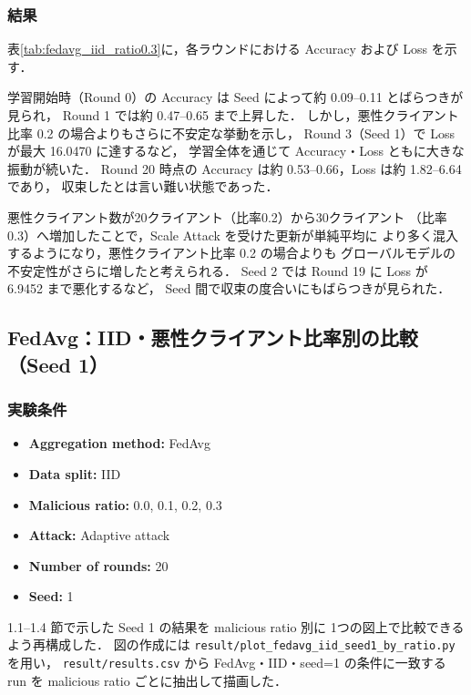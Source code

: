 \documentclass[a4j,twocolumn,dvipdfmx]{jsarticle}
\begin{document}
\subsubsection{結果}

表\ref{tab:fedavg_iid_ratio0.3}に，各ラウンドにおける
Accuracy および Loss を示す．

学習開始時（Round 0）の Accuracy は Seed によって約 0.09--0.11 とばらつきが見られ，
Round 1 では約 0.47--0.65 まで上昇した．
しかし，悪性クライアント比率 0.2 の場合よりもさらに不安定な挙動を示し，
Round 3（Seed 1）で Loss が最大 16.0470 に達するなど，
学習全体を通じて Accuracy・Loss ともに大きな振動が続いた．
Round 20 時点の Accuracy は約 0.53--0.66，Loss は約 1.82--6.64 であり，
収束したとは言い難い状態であった．

悪性クライアント数が20クライアント（比率0.2）から30クライアント
（比率0.3）へ増加したことで，Scale Attack を受けた更新が単純平均に
より多く混入するようになり，悪性クライアント比率 0.2 の場合よりも
グローバルモデルの不安定性がさらに増したと考えられる．
Seed 2 では Round 19 に Loss が 6.9452 まで悪化するなど，
Seed 間で収束の度合いにもばらつきが見られた．

\clearpage
\subsection{FedAvg：IID・悪性クライアント比率別の比較（Seed 1）}

\subsubsection{実験条件}

\begin{itemize}
    \item \textbf{Aggregation method:} FedAvg
    \item \textbf{Data split:} IID
    \item \textbf{Malicious ratio:} 0.0, 0.1, 0.2, 0.3
    \item \textbf{Attack:} Adaptive attack
    \item \textbf{Number of rounds:} 20
    \item \textbf{Seed:} 1
\end{itemize}

1.1--1.4 節で示した Seed 1 の結果を malicious ratio 別に
1つの図上で比較できるよう再構成した．
図の作成には \verb|result/plot_fedavg_iid_seed1_by_ratio.py| を用い，
\verb|result/results.csv| から FedAvg・IID・seed=1 の条件に一致する
run を malicious ratio ごとに抽出して描画した．
\end{document}

